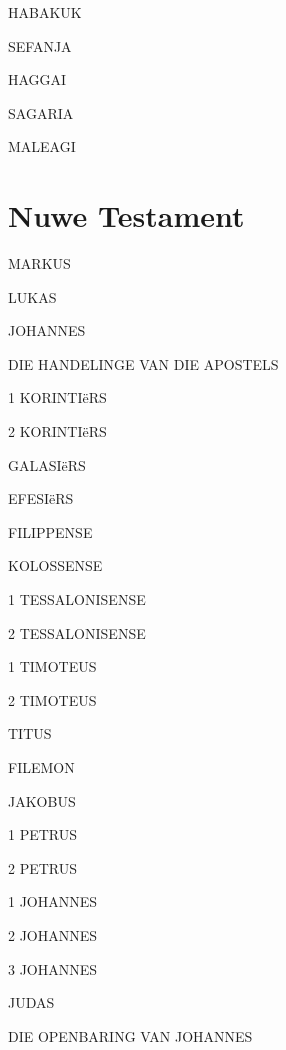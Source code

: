 \documentclass[twoside,twocolumn,letterpaper]{book}
\newcommand{\jnumChapters}{0}
\begin{document}
HABAKUK

SEFANJA

HAGGAI

SAGARIA

MALEAGI





\part*{Nuwe Testament}
\setlength{\columnseprule}{0.0pt}
\renewcommand{\jnumChapters}{0}



MARKUS

LUKAS

JOHANNES

DIE HANDELINGE VAN DIE APOSTELS











1 KORINTIëRS

2 KORINTIëRS

GALASIëRS

EFESIëRS

FILIPPENSE

KOLOSSENSE

1 TESSALONISENSE

2 TESSALONISENSE

1 TIMOTEUS

2 TIMOTEUS

TITUS

FILEMON



JAKOBUS

1 PETRUS

2 PETRUS

1 JOHANNES

2 JOHANNES

3 JOHANNES

JUDAS

DIE OPENBARING VAN JOHANNES
\end{document}
